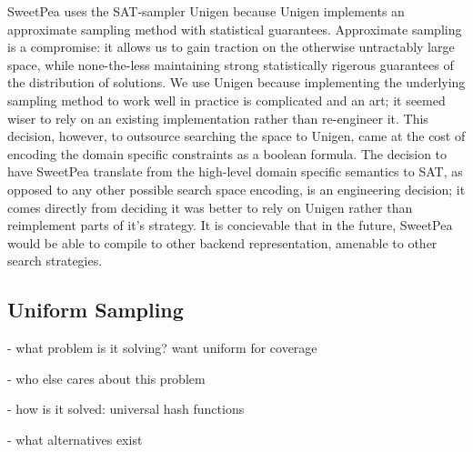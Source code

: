 SweetPea uses the SAT-sampler Unigen because Unigen implements an approximate sampling method with statistical guarantees. Approximate sampling is a compromise: it allows us to gain traction on the otherwise untractably large space, while none-the-less maintaining strong statistically rigerous guarantees of the distribution of solutions. We use Unigen because implementing the underlying sampling method to work well in practice is complicated and an art; it seemed wiser to rely on an existing implementation rather than re-engineer it. This decision, however, to outsource searching the space to Unigen, came at the cost of encoding the domain specific constraints as a boolean formula. The decision to have SweetPea translate from the high-level domain specific semantics to SAT, as opposed to any other possible search space encoding, is an engineering decision; it comes directly from deciding it was better to rely on Unigen rather than reimplement parts of it's strategy. It is concievable that in the future, SweetPea would be able to compile to other backend representation, amenable to other search strategies.

\subsection{Uniform Sampling}

\cite{meel2016constrained}

- what problem is it solving? want uniform for coverage

- who else cares about this problem

- how is it solved: universal hash functions

- what alternatives exist
